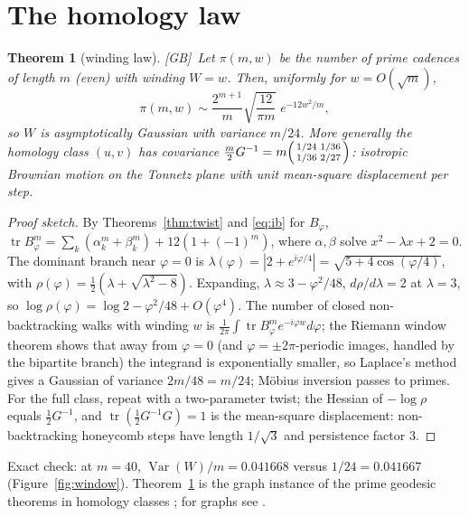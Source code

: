 \documentclass[11pt]{amsart}
\numberwithin{equation}{section}
\theoremstyle{plain}
\newtheorem{theorem}{Theorem}[section]
\theoremstyle{definition}\newtheorem{definition}[theorem]{Definition}
\theoremstyle{remark}\newtheorem{remark}[theorem]{Remark}
\newcommand{\ctag}[1]{\textup{\textsf{\scriptsize[#1]}}}
\begin{document}
\section{The homology law}
\begin{theorem}[winding law]\label{thm:clt}
\ctag{GB}\ Let $\pi(m,w)$ be the number of prime cadences of length $m$ (even) with winding $W=w$. Then, uniformly for $w=O(\sqrt m)$,
\[\pi(m,w)\sim\frac{2^{m+1}}{m}\sqrt{\frac{12}{\pi m}}\;e^{-12w^2/m},\]
so $W$ is asymptotically Gaussian with variance $m/24$. More generally the homology class $(u,v)$ has covariance $\frac m2G^{-1}=m\begin{psmallmatrix}1/24&1/36\\1/36&2/27\end{psmallmatrix}$: isotropic Brownian motion on the Tonnetz plane with unit mean-square displacement per step.
\end{theorem}
\begin{proof}[Proof sketch]
By Theorems~\ref{thm:twist} and \eqref{eq:ib} for $B_\varphi$, $\operatorname{tr}B_\varphi^m=\sum_k(\alpha_k^m+\beta_k^m)+12(1+(-1)^m)$, where $\alpha,\beta$ solve $x^2-\lambda x+2=0$. The dominant branch near $\varphi=0$ is $\lambda(\varphi)=|2+e^{i\varphi/4}|=\sqrt{5+4\cos(\varphi/4)}$, with $\rho(\varphi)=\frac12(\lambda+\sqrt{\lambda^2-8})$. Expanding, $\lambda\approx3-\varphi^2/48$, $d\rho/d\lambda=2$ at $\lambda=3$, so $\log\rho(\varphi)=\log2-\varphi^2/48+O(\varphi^4)$. The number of closed non-backtracking walks with winding $w$ is $\frac1{2\pi}\int\operatorname{tr}B_\varphi^me^{-i\varphi w}d\varphi$; the Riemann window theorem shows that away from $\varphi=0$ (and $\varphi=\pm2\pi$-periodic images, handled by the bipartite branch) the integrand is exponentially smaller, so Laplace's method gives a Gaussian of variance $2m/48=m/24$; M\"obius inversion passes to primes. For the full class, repeat with a two-parameter twist; the Hessian of $-\log\rho$ equals $\frac12G^{-1}$, and $\operatorname{tr}(\frac12G^{-1}G)=1$ is the mean-square displacement: non-backtracking honeycomb steps have length $1/\sqrt3$ and persistence factor $3$.
\end{proof}
Exact check: at $m=40$, $\operatorname{Var}(W)/m=0.041668$ versus $1/24=0.041667$ (Figure~\ref{fig:window}). Theorem~\ref{thm:clt} is the graph instance of the prime geodesic theorems in homology classes \cite{ps87,ks90,lalley89,ps01}; for graphs see \cite{liu04,luoroy}.
\end{document}
